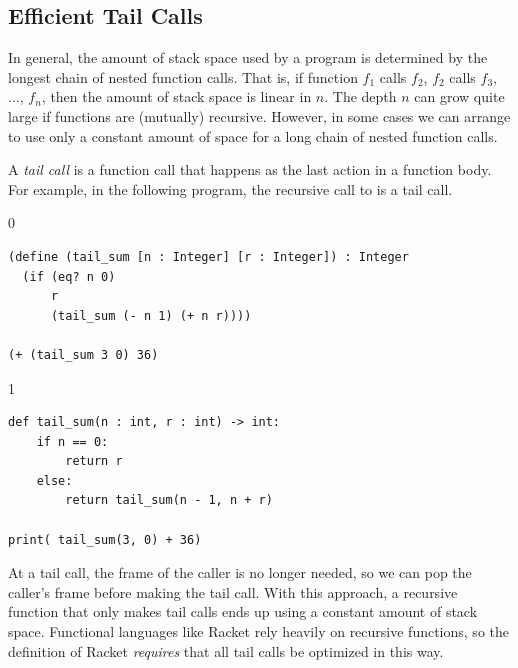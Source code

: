 \documentclass[7x10,nocrop]{TimesAPriori_MIT}%
\def\racketEd{0}
\def\pythonEd{1}
\def\edition{0}
\begin{document}

\subsection{Efficient Tail Calls}
\label{sec:tail-call}

In general, the amount of stack space used by a program is determined
by the longest chain of nested function calls. That is, if function
$f_1$ calls $f_2$, $f_2$ calls $f_3$, $\ldots$, $f_n$, then the amount
of stack space is linear in $n$.  The depth $n$ can grow quite large
if functions are (mutually) recursive. However, in
some cases we can arrange to use only a constant amount of space for a
long chain of nested function calls.

A \emph{tail call} is a function call that
happens as the last action in a function body. 
For example, in the following
program, the recursive call to  is a tail call.
\begin{center}
{\if\edition\racketEd  
\begin{lstlisting}
(define (tail_sum [n : Integer] [r : Integer]) : Integer
  (if (eq? n 0) 
      r
      (tail_sum (- n 1) (+ n r))))

(+ (tail_sum 3 0) 36)
\end{lstlisting}
\fi}
{\if\edition\pythonEd
\begin{lstlisting}
def tail_sum(n : int, r : int) -> int:
    if n == 0:
        return r
    else:
        return tail_sum(n - 1, n + r)

print( tail_sum(3, 0) + 36)
\end{lstlisting}
\fi}
\end{center}
At a tail call, the frame of the caller is no longer needed, so we can
pop the caller's frame before making the tail call. With this
approach, a recursive function that only makes tail calls ends up 
using a constant amount of stack space.  Functional languages like
Racket rely heavily on recursive functions, so the definition of
Racket \emph{requires} that all tail calls be optimized in this way.
\end{document}
